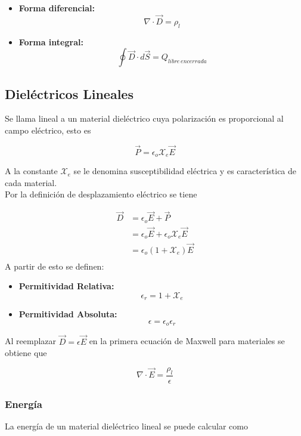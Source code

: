 \begin{itemize}
    \item \textbf{Forma diferencial:}
    \[\nabla\cdot\Vec{D}=\rho_l\]
    \item \textbf{Forma integral:}
    \[\oint\Vec{D}\cdot d\Vec{S}=Q_{libre\,encerrada}\]
\end{itemize}

\subsection{Dieléctricos Lineales}

Se llama lineal a un material dieléctrico cuya polarización es proporcional al campo eléctrico, esto es

\[\Vec{P}=\epsilon_o\mathcal{X}_e\Vec{E}\]

A la constante $\mathcal{X}_e$ se le denomina susceptibilidad eléctrica y es característica de cada material.\\

Por la definición de desplazamiento eléctrico se tiene

\begin{equation}
\begin{split}
    \Vec{D} &= \epsilon_o\Vec{E}+\Vec{P}\\
    &= \epsilon_o\Vec{E}+\epsilon_o\mathcal{X}_e\Vec{E}\\
    &= \epsilon_o(1+\mathcal{X}_e)\Vec{E}\\
\end{split}
\nonumber
\end{equation}
\bigbreak
A partir de esto se definen:

\begin{itemize}
    \item \textbf{Permitividad Relativa:}
    \[\epsilon_r=1+\mathcal{X}_e\]
    \item \textbf{Permitividad  Absoluta:}
    \[\epsilon = \epsilon_o\epsilon_r\]
\end{itemize}

Al reemplazar $\Vec{D}=\epsilon\Vec{E}$ en la primera ecuación de Maxwell para materiales se obtiene que

\[\nabla\cdot\Vec{E}=\frac{\rho_l}{\epsilon}\]

\subsubsection{Energía}

La energía de un material dieléctrico lineal se puede calcular como


